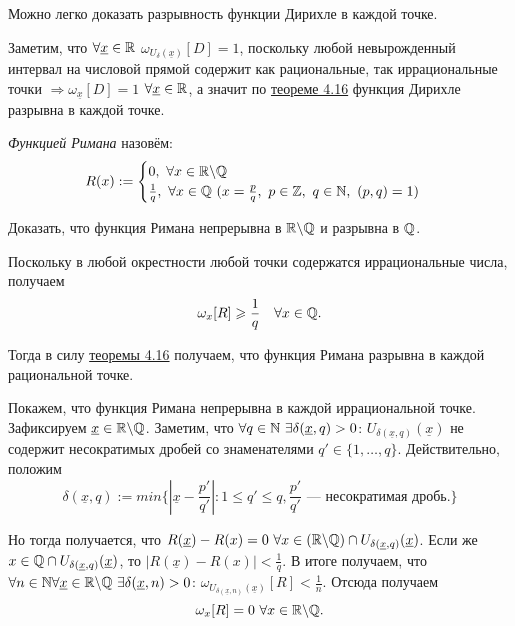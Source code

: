 \begin{note}
    Можно легко доказать разрывность функции Дирихле в каждой точке.

    Заметим, что $\forall \underline{x} \in \mathbb{R}$ $\omega_{U_{\delta} (\underline{x})} [D] = 1$, поскольку любой невырожденный интервал на числовой прямой содержит как рациональные, так иррациональные точки $\Rightarrow \omega_{\underline{x}} [D] = 1$ $\forall \underline{x} \in \mathbb{R}$, а значит по \hyperlink{thm4.16}{теореме 4.16} функция Дирихле разрывна в каждой точке.
\end{note}
\begin{definition}
    \textit{Функцией Римана} назовём:
    $$
    R (x) := \begin{cases}
        0, \  \forall x \in \mathbb{R} \backslash \mathbb{Q} \\
        \frac{1}{q}, \  \forall x \in \mathbb{Q} \ (x = \frac{p}{q}, \ p \in \mathbb{Z}, \ q \in \mathbb{N}, \ (p, q) = 1)
    \end{cases}
    $$
\end{definition}
\begin{problem}
    Доказать, что функция Римана непрерывна в $\mathbb{R} \backslash \mathbb{Q}$ и разрывна в $\mathbb{Q}$.
\end{problem}
\begin{solution}
    Поскольку в любой окрестности любой точки содержатся иррациональные числа, получаем
    $$ \omega_{x} [R] \geqslant \frac{1}{q} \quad  \forall x \in \mathbb{Q}.$$

    Тогда в силу \hyperlink{thm4.16}{теоремы 4.16} получаем, что функция Римана разрывна в каждой рациональной точке.

    Покажем, что функция Римана непрерывна в каждой иррациональной точке. Зафиксируем $\underline{x} \in \mathbb{R} \backslash \mathbb{Q}$. Заметим, что $\forall q \in \N \ \exists \delta (\underline{x}, q) > 0$: $U_{\delta (\underline{x}, q)} (\underline{x})$ не содержит несократимых дробей со знаменателями $q' \in \{ 1, \ldots, q \}$. Действительно, положим
    $$ \delta (\underline{x}, q) := min \{ |\underline{x} - \frac{p'}{q'}|: 1 \leq q' \leq q, \frac{p'}{q'}\text{~---~несократимая дробь.}\}$$

    Но тогда получается, что $R (\underline{x}) - R (x) = 0 \  \forall x \in (\mathbb{R} \backslash \mathbb{Q}) \cap U_{\delta (\underline{x}, q)} (\underline{x})$. Если же $x \in \mathbb{Q} \cap U_{\delta (\underline{x}, q)} (\underline{x})$, то $| R (\underline{x}) - R (x)| < \frac{1}{q}$. В итоге получаем, что $\forall n \in \mathbb{N} \forall \underline{x} \in \mathbb{R} \backslash \mathbb{Q} \  \exists \delta (\underline{x}, n) > 0$: $\omega_{U_{\delta (\underline{x}, n)} (\underline{x})} [R] < \frac{1}{n}$. Отсюда получаем
    $$ \omega_{x} [R] = 0 \  \forall x \in \mathbb{R} \backslash \mathbb{Q}.$$
\end{solution}
